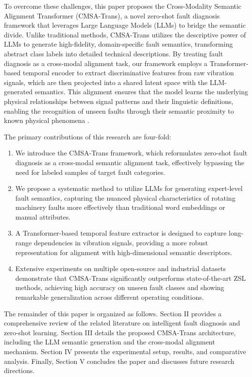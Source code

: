 To overcome these challenges, this paper proposes the Cross-Modality Semantic Alignment Transformer (CMSA-Trans), a novel zero-shot fault diagnosis framework that leverages Large Language Models (LLMs) to bridge the semantic divide. Unlike traditional methods, CMSA-Trans utilizes the descriptive power of LLMs to generate high-fidelity, domain-specific fault semantics, transforming abstract class labels into detailed technical descriptions. By treating fault diagnosis as a cross-modal alignment task, our framework employs a Transformer-based temporal encoder to extract discriminative features from raw vibration signals, which are then projected into a shared latent space with the LLM-generated semantics. This alignment ensures that the model learns the underlying physical relationships between signal patterns and their linguistic definitions, enabling the recognition of unseen faults through their semantic proximity to known physical phenomena \cite{vaswani2017attention, radford2021learning}.

The primary contributions of this research are four-fold:
\begin{enumerate}
    \item We introduce the CMSA-Trans framework, which reformulates zero-shot fault diagnosis as a cross-modal semantic alignment task, effectively bypassing the need for labeled samples of target fault categories.
    \item We propose a systematic method to utilize LLMs for generating expert-level fault semantics, capturing the nuanced physical characteristics of rotating machinery faults more effectively than traditional word embeddings or manual attributes.
    \item A Transformer-based temporal feature extractor is designed to capture long-range dependencies in vibration signals, providing a more robust representation for alignment with high-dimensional semantic descriptors.
    \item Extensive experiments on multiple open-source and industrial datasets demonstrate that CMSA-Trans significantly outperforms state-of-the-art ZSL methods, achieving high accuracy on unseen fault classes and showing remarkable generalization across different operating conditions.
\end{enumerate}

The remainder of this paper is organized as follows. Section II provides a comprehensive review of the related literature on intelligent fault diagnosis and zero-shot learning. Section III details the proposed CMSA-Trans architecture, including the LLM semantic generation and the cross-modal alignment mechanism. Section IV presents the experimental setup, results, and comparative analysis. Finally, Section V concludes the paper and discusses future research directions.

